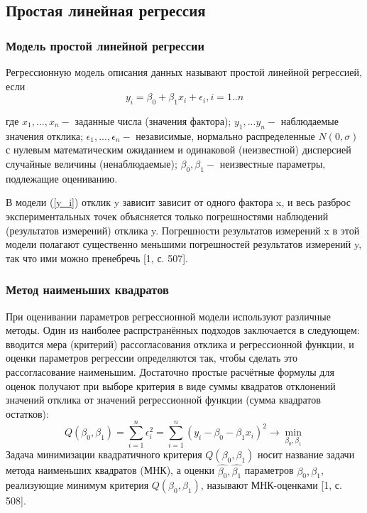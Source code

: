 \subsection{Простая линейная регрессия}
	\subsubsection{Модель простой линейной регрессии}
	Регрессионную модель описания данных называют простой линейной регрессией, если
	\begin{equation}
	    y_{i} = \beta_{0} + \beta_{1}x_{i} + \epsilon_{i},  i = 1..n
	    \label{y_i}
	\end{equation}

	где $x_1,...,x_n - $ заданные числа (значения фактора);
	$y_1,...y_n - $ наблюдаемые значения отклика;
	$\epsilon_1,...,\epsilon_n - $ независимые, нормально распределенные $N(0, \sigma)$ с нулевым математическим ожиданием и одинаковой (неизвестной) дисперсией случайные величины (ненаблюдаемые);
	$\beta_0, \beta_1 - $ неизвестные параметры, подлежащие оцениванию.
	
    В модели (\ref{y_i}) отклик y зависит зависит от одного фактора x, и весь разброс экспериментальных точек объясняется только погрешностями наблюдений (результатов измерений) отклика y. Погрешности результатов измерений x в этой модели полагают существенно меньшими погрешностей результатов измерений y, так что ими можно пренебречь [1, с. 507].


	
	\subsubsection{Метод наименьших квадратов}
	При оценивании параметров регрессионной модели используют различные методы. Один из наиболее распрстранённых подходов заключается в следующем: вводится мера (критерий) рассогласования отклика и регрессионной функции, и оценки параметров регрессии определяются так, чтобы сделать это рассогласование наименьшим. Достаточно простые расчётные формулы для оценок получают при выборе критерия в виде суммы квадратов отклонений значений отклика от значений регрессионной функции (сумма квадратов остатков):
	\begin{equation}
	    Q(\beta_{0}, \beta_{1}) = \sum_{i=1}^{n}{\epsilon_{i}^{2}} = 
	    \sum_{i=1}^{n}{(y_{i} - \beta_{0} - \beta_{1}x_{i})^{2}}\rightarrow \min_{\beta_{0}, \beta_{1}}
	    \label{Q_beta}
	\end{equation}
	Задача минимизации квадратичного критерия $Q(\beta_0, \beta_1)$ носит название задачи метода наименьших квадратов (МНК), а оценки $\hat{\beta_0}, \hat{\beta_1}$ параметров $\beta_0, \beta_1$, реализующие минимум критерия $Q(\beta_0, \beta_1)$, называют МНК-оценками [1, с. 508]. 

